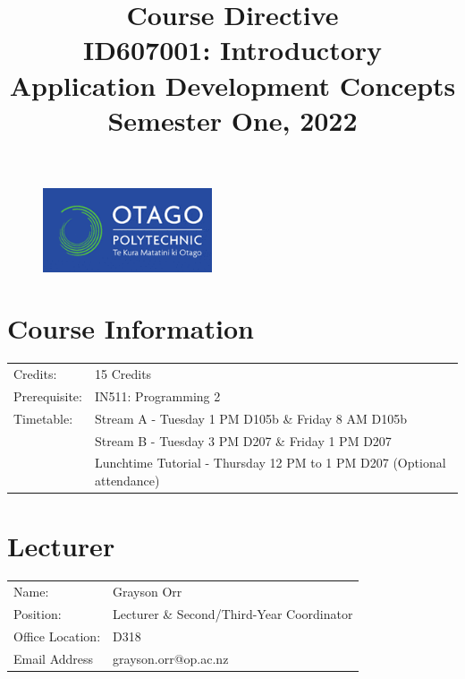 \documentclass{article}
\author{}
\begin{document}
\begin{figure}
	\includegraphics[width=50mm]{../img/logo.png}
\end{figure}

\title{Course Directive\\ID607001: Introductory Application Development Concepts\\Semester One, 2022}
\date{}
\maketitle

\section*{Course Information}
\begin{tabular}{ll}
	Credits:      & 15 Credits                                                             \\
	Prerequisite: & IN511: Programming 2                                                   \\
	Timetable:    & Stream A - Tuesday 1 PM D105b \& Friday 8 AM D105b                     \\
	              & Stream B - Tuesday 3 PM D207 \& Friday 1 PM D207                       \\
	              & Lunchtime Tutorial - Thursday 12 PM to 1 PM D207 (Optional attendance)
\end{tabular}

\section*{Lecturer}
\begin{tabular}{ll}
	Name:            & Grayson Orr                               \\
	Position:        & Lecturer \& Second/Third-Year Coordinator \\
	Office Location: & D318                                      \\
	Email Address    & grayson.orr@op.ac.nz                      \\
\end{tabular}
\end{document}
